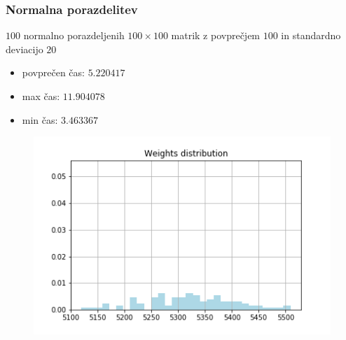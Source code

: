 \documentclass{beamer}
\begin{document}
\begin{frame}
    \frametitle{Normalna porazdelitev}
    \begin{block}{}
        $100$ normalno porazdeljenih $100 \times 100$ matrik z povprečjem $100$ in
        standardno deviacijo $20$
        \begin{itemize}
            \item povprečen čas: $5.220417$
            \item max čas: $11.904078$
            \item min čas: $3.463367$
        \end{itemize}
    \end{block}
    \begin{figure}[htbp]
        \centerline{\includegraphics[scale=0.40]{picture220min.png}}
    \end{figure}
\end{frame}
\end{document}
